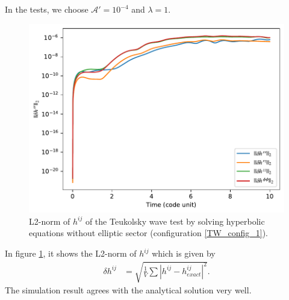In the tests, we choose $\mathcal{A}'=10^{-4}$ and $\lambda=1$.
\begin{figure}[h!]
\centering
  \includegraphics[width=\linewidth]{herr.pdf}
\caption{L2-norm of $h^{ij}$ of the Teukolsky wave test by solving hyperbolic equations without elliptic sector (configuration \ref{TW_config_1}).}
\label{fig:TW_h_err}
\end{figure}
In figure \ref{fig:TW_h_err},
it shows the L2-norm of $h^{ij}$ which is given by
\begin{align}
    \delta h^{ij} &= \sqrt{\frac{1}{V}\sum \left| h^{ij} - h^{ij}_{exact} \right|^2}.
\end{align}
The simulation result agrees with the analytical solution very well.

